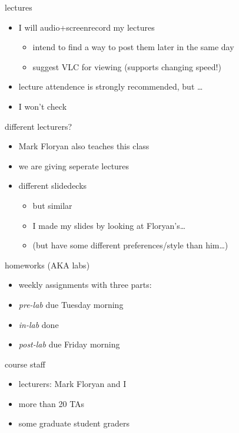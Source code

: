 \begin{frame}{lectures}
    \begin{itemize}
    \item I will audio+screenrecord my lectures
        \begin{itemize}
        \item intend to find a way to post them later in the same day
        \item suggest VLC for viewing (supports changing speed!)
        \end{itemize}
    \item lecture attendence is strongly recommended, but \ldots
    \item I won't check
    \end{itemize}
\end{frame}

\begin{frame}{different lecturers?}
    \begin{itemize}
    \item Mark Floryan also teaches this class
    \item we are giving seperate lectures
    \item different slidedecks
        \begin{itemize}
        \item but similar
        \item I made my slides by looking at Floryan's\ldots
        \item (but have some different preferences/style than him\ldots)
        \end{itemize}
    \end{itemize}
\end{frame}

\begin{frame}{homeworks (AKA labs)}
    \begin{itemize}
    \item weekly assignments with three parts:
    \vspace{.5cm}
    \item \textit{pre-lab} due Tuesday morning
    \item \textit{in-lab} done 
    \item \textit{post-lab} due Friday morning
    \end{itemize}
\end{frame}

\begin{frame}{course staff}
    \begin{itemize}
        \item lecturers: Mark Floryan and I
        \item more than 20 TAs
        \item some graduate student graders
    \end{itemize}
\end{frame}

